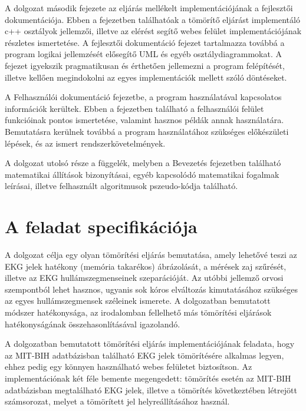 \documentclass[oneside,titlepage,12pt,a4paper]{report}
\begin{document}
\par	A dolgozat második fejezete az eljárás mellékelt implementációjának a fejlesztői dokumentációja. Ebben a fejezetben találhatóak a tömörítő eljárást implementáló c++ osztályok jellemzői, illetve az elérést segítő webes felület implementációjának részletes ismertetése. A fejlesztői dokumentáció fejezet tartalmazza továbbá a program logikai jellemzését elősegítő UML és egyéb osztálydiagrammokat. A fejezet igyekszik pragmatikusan és érthetően jellemezni a program felépítését, illetve kellően megindokolni az egyes implementációk mellett szóló döntéseket. 
\par	A Felhasználói dokumentáció fejezetbe, a program használatával kapcsolatos információk kerültek. Ebben a fejezetben található a felhasználói felület funkcióinak pontos ismertetése, valamint hasznos példák annak használatára. Bemutatásra kerülnek továbbá a program használatához szükséges előkészületi lépések, és az ismert rendszerkövetelmények. 
\par	A dolgozat utolsó része a függelék, melyben a Bevezetés fejezetben található matematikai állítások bizonyításai, egyéb kapcsolódó matematikai fogalmak leírásai, illetve felhasznált algoritmusok pszeudo-kódja található. 
		
\section{A feladat specifikációja}

A dolgozat célja egy olyan tömörítési eljárás bemutatása, amely lehetővé teszi az EKG jelek hatékony (memória takarékos) ábrázolását, a mérések zaj szűrését, illetve az EKG hullámszegmenseinek szeparációját. Az utóbbi jellemző orvosi szempontból lehet hasznos, ugyanis sok kóros elváltozás kimutatásához szükséges az egyes hullámszegmensek széleinek ismerete. A dolgozatban bemutatott módszer hatékonysága, az irodalomban fellelhető más tömörítési eljárások \cite{} hatékonyságának összehasonlításával igazolandó. \par A dolgozatban bemutatott tömörítési eljárás implementációjának feladata, hogy az MIT-BIH adatbázisban található EKG jelek tömörítésére alkalmas legyen, ehhez pedig egy könnyen használható webes felületet biztosítson. Az implementációnak két féle bemente megengedett: tömörítés esetén az MIT-BIH adatbázisban megtalálható EKG jelek, illetve a tömörítés következtében létrejött számsorozat, melyet a tömörített jel helyreállításához használ.  
\end{document}
